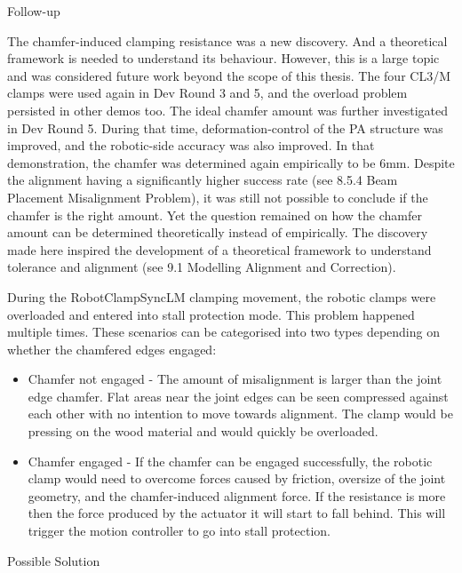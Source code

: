Follow-up

The chamfer-induced clamping resistance was a new discovery. And a theoretical framework is needed to understand its behaviour. However, this is a large topic and was considered future work beyond the scope of this thesis. The four CL3/M clamps were used again in Dev Round 3 and 5, and the overload problem persisted in other demos too. 
The ideal chamfer amount was further investigated in Dev Round 5. During that time, deformation-control of the PA structure was improved, and the robotic-side accuracy was also improved. In that demonstration, the chamfer was determined again empirically to be 6mm. Despite the alignment having a significantly higher success rate (see 8.5.4 Beam Placement Misalignment Problem), it was still not possible to conclude if the chamfer is the right amount.
Yet the question remained on how the chamfer amount can be determined theoretically instead of empirically. The discovery made here inspired the development of a theoretical framework to understand tolerance and alignment (see 9.1 Modelling Alignment and Correction).


During the RobotClampSyncLM clamping movement, the robotic clamps were overloaded and entered into stall protection mode. This problem happened multiple times. These scenarios can be categorised into two types depending on whether the chamfered edges engaged:
\begin{itemize}
\item Chamfer not engaged - The amount of misalignment is larger than the joint edge chamfer. Flat areas near the joint edges can be seen compressed against each other with no intention to move towards alignment. The clamp would be pressing on the wood material and would quickly be overloaded.
\item Chamfer engaged - If the chamfer can be engaged successfully, the robotic clamp would need to overcome forces caused by friction, oversize of the joint geometry, and the chamfer-induced alignment force. If the resistance is more then the force produced by the actuator it will start to fall behind. This will trigger the motion controller to go into stall protection.
\end{itemize}

Possible Solution

